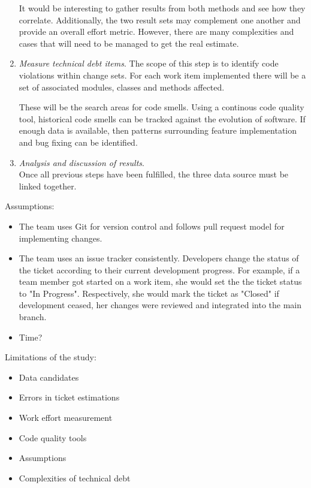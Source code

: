 \documentclass{mprop}
\begin{document}
\begin{enumerate}
	It would be interesting to gather results from both methods and see how they
	correlate. Additionally, the two result sets may complement one another and
	provide an overall effort metric. However, there are many complexities and
	cases that will need to be managed to get the real estimate. 

	\item \textit{Measure technical debt items}. The scope of this step is to
	identify code violations within change sets. For each work item implemented
	there will be a set of associated modules, classes and methods affected.
	
	These will be the search areas for code smells. Using a continous code
	quality tool, historical code smells can be tracked against the evolution of
	software. If enough data is available, then patterns surrounding feature
	implementation and bug fixing can be identified.

	\item \textit{Analysis and discussion of results}.\\
	Once all previous steps have been fulfilled, the three data source must be
	linked together.

\end{enumerate}

Assumptions:
\begin{itemize}
	\item The team uses Git for version control and follows pull request model
	for implementing changes.
	\item The team uses an issue tracker consistently. Developers change the
	status of the ticket according to their current development progress. For
	example, if a team member got started on a work item, she would set the the
	ticket status to "In Progress". Respectively, she would mark the ticket as
	"Closed" if development ceased, her changes were reviewed and integrated
	into the main branch.
	\item Time?
\end{itemize}

Limitations of the study:
\begin{itemize}
	\item Data candidates
	\item Errors in ticket estimations
	\item Work effort measurement
	\item Code quality tools
	\item Assumptions
	\item Complexities of technical debt
\end{itemize}
\end{document}
